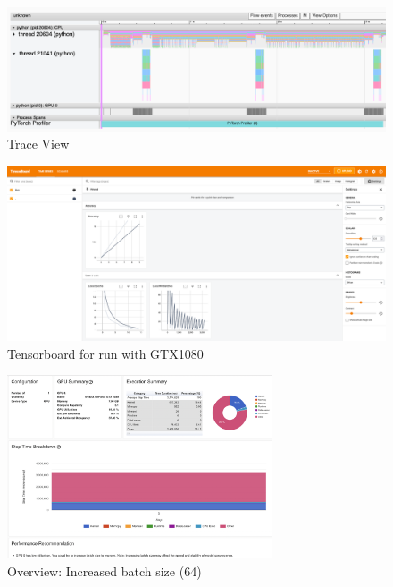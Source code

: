 \documentclass[12pt, a4paper, hidelinks]{article}
\begin{document}
\begin{figure}[H]
\centering
\includegraphics[width=1\textwidth]{./assets/scap_gtx1080_profiler-torch_batch-size-64_14650758_trace-view}
\caption*{Trace View}
\label{fig:scap_gtx1080_profiler-torch_batch-size-64_14650758_trace-view}
\end{figure}

\begin{figure}[H]
\centering
\includegraphics[width=1\textwidth]{./assets/scap_gtx1080_tensorboard_14615343}
\caption*{Tensorboard for run with GTX1080}
\label{fig:scap_gtx1080_tensorboard_14615343}
\end{figure}

\begin{figure}[H]
\centering
\includegraphics[width=0.7\textwidth]{./assets/scap_gtx1080_profiler-torch_batch-size-64_14650758}
\caption[test]{Overview: Increased batch size (64)}
\label{fig:scap_gtx1080_profiler-torch_batch-size-64_14650758}
\end{figure}
\end{document}
